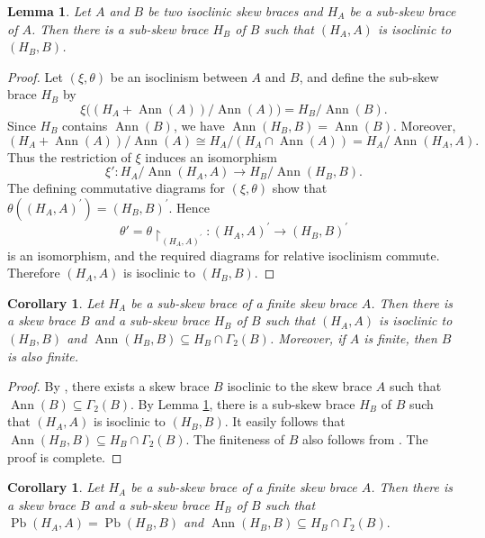 \documentclass[11pt, oneside]{amsart}
\numberwithin{equation}{section}
\theoremstyle{plain}
\newtheorem{cor}[equation]{Corollary}
\newtheorem{lem}[equation]{Lemma}
\theoremstyle{definition}
\newcommand{\Pb}{\operatorname{Pb} }
\newcommand{\Ann}{\operatorname{Ann} }
\begin{document}
\begin{lem}\label{sub-skew brace isoclinic}
    Let $A$ and $B$ be two isoclinic skew braces and $H_A$ be a sub-skew brace of $A$. Then there is a sub-skew brace $H_B$ of $B$ such that $(H_A,A) $ is isoclinic to $(H_B,B)$.
\end{lem}
\begin{proof}
    Let $(\xi,\theta)$ be an isoclinism between $A$ and $B$, and define the sub-skew brace $H_B$ by
    $$
    \xi\big((H_A+\Ann(A))/\Ann(A)\big)=H_B/\Ann(B).
    $$
    Since $H_B$ contains $\Ann(B)$, we have $\Ann(H_B,B)=\Ann(B)$. Moreover,
    $$
    (H_A+\Ann(A))/\Ann(A) \cong H_A/(H_A\cap\Ann(A))
    =H_A/\Ann(H_A,A).
    $$
    Thus the restriction of $\xi$ induces an isomorphism
    $$
    \xi':H_A/\Ann(H_A,A)\longrightarrow H_B/\Ann(H_B,B).
    $$
    The defining commutative diagrams for $(\xi,\theta)$ show that
    $\theta((H_A,A)^\prime)=(H_B,B)^\prime$. Hence
    $$
    \theta'=\theta{\restriction}_{(H_A,A)^\prime}:(H_A,A)^\prime\longrightarrow(H_B,B)^\prime
    $$
    is an isomorphism, and the required diagrams for relative isoclinism commute. Therefore $(H_A,A)$ is isoclinic to $(H_B,B)$.
\end{proof}



\begin{cor}\label{existance of relative stem}
    Let $H_A$ be a sub-skew brace of a finite skew brace $A$. Then there is a skew brace $B$ and a sub-skew brace $H_B$ of $B$ such that $(H_A,A) $ is isoclinic to $(H_B,B) $ and $\Ann(H_B,B)\subseteq H_B\cap \Gamma_2(B)$. Moreover, if $A$ is finite, then $B$ is also finite.
\end{cor}
\begin{proof}
    By \cite[Theorem 2.18]{LV24}, there exists a skew brace $B$ isoclinic to the skew brace $A$ such that $\Ann(B)\subseteq \Gamma_2(B)$. By Lemma \ref{sub-skew brace isoclinic}, there is a sub-skew brace $H_B$ of $B$ such that $(H_A,A) $ is isoclinic to $(H_B,B)$. It easily follows that $\Ann(H_B,B)\subseteq H_B\cap \Gamma_2(B)$. The finiteness of $B$ also follows from \cite{LV24}.  The proof is complete. 
\end{proof}

\begin{cor}
    Let $H_A$ be a sub-skew brace of a finite skew brace $A$. Then there is a skew brace $B$ and a sub-skew brace $H_B$ of $B$ such that $\Pb(H_A,A) = \Pb(H_B,B) $ and $\Ann(H_B,B)\subseteq H_B\cap \Gamma_2(B).$
\end{cor}
\end{document}
